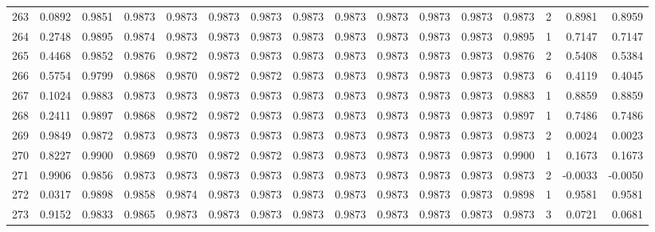 \begin{tabular}{lrrrrrrrrrrrrrrr}
263 &      0.0892 &  0.9851 &  0.9873 &  0.9873 &  0.9873 &  0.9873 &  0.9873 &  0.9873 &  0.9873 &  0.9873 &   0.9873 &     0.9873 &      2 &                    0.8981 &                     0.8959 \\
264 &      0.2748 &  0.9895 &  0.9874 &  0.9873 &  0.9873 &  0.9873 &  0.9873 &  0.9873 &  0.9873 &  0.9873 &   0.9873 &     0.9895 &      1 &                    0.7147 &                     0.7147 \\
265 &      0.4468 &  0.9852 &  0.9876 &  0.9872 &  0.9873 &  0.9873 &  0.9873 &  0.9873 &  0.9873 &  0.9873 &   0.9873 &     0.9876 &      2 &                    0.5408 &                     0.5384 \\
266 &      0.5754 &  0.9799 &  0.9868 &  0.9870 &  0.9872 &  0.9872 &  0.9873 &  0.9873 &  0.9873 &  0.9873 &   0.9873 &     0.9873 &      6 &                    0.4119 &                     0.4045 \\
267 &      0.1024 &  0.9883 &  0.9873 &  0.9873 &  0.9873 &  0.9873 &  0.9873 &  0.9873 &  0.9873 &  0.9873 &   0.9873 &     0.9883 &      1 &                    0.8859 &                     0.8859 \\
268 &      0.2411 &  0.9897 &  0.9868 &  0.9872 &  0.9872 &  0.9873 &  0.9873 &  0.9873 &  0.9873 &  0.9873 &   0.9873 &     0.9897 &      1 &                    0.7486 &                     0.7486 \\
269 &      0.9849 &  0.9872 &  0.9873 &  0.9873 &  0.9873 &  0.9873 &  0.9873 &  0.9873 &  0.9873 &  0.9873 &   0.9873 &     0.9873 &      2 &                    0.0024 &                     0.0023 \\
270 &      0.8227 &  0.9900 &  0.9869 &  0.9870 &  0.9872 &  0.9872 &  0.9873 &  0.9873 &  0.9873 &  0.9873 &   0.9873 &     0.9900 &      1 &                    0.1673 &                     0.1673 \\
271 &      0.9906 &  0.9856 &  0.9873 &  0.9873 &  0.9873 &  0.9873 &  0.9873 &  0.9873 &  0.9873 &  0.9873 &   0.9873 &     0.9873 &      2 &                   -0.0033 &                    -0.0050 \\
272 &      0.0317 &  0.9898 &  0.9858 &  0.9874 &  0.9873 &  0.9873 &  0.9873 &  0.9873 &  0.9873 &  0.9873 &   0.9873 &     0.9898 &      1 &                    0.9581 &                     0.9581 \\
273 &      0.9152 &  0.9833 &  0.9865 &  0.9873 &  0.9873 &  0.9873 &  0.9873 &  0.9873 &  0.9873 &  0.9873 &   0.9873 &     0.9873 &      3 &                    0.0721 &                     0.0681 \\

\end{tabular}
